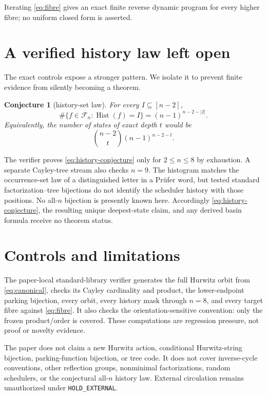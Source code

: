 \documentclass[a4paper,10pt]{amsart}
\newtheorem{conjecture}[theorem]{Conjecture}
\theoremstyle{remark}
\newcommand{\Fcal}{\mathcal F}
\newcommand{\Hist}{\operatorname{Hist}}
\begin{document}
Iterating \eqref{eq:fibre} gives an exact finite reverse dynamic program for
every higher fibre; no uniform closed form is asserted.

\section{A verified history law left open}

The exact controls expose a stronger pattern.  We isolate it to prevent
finite evidence from silently becoming a theorem.

\begin{conjecture}[history-set law]\label{conj:history}
For every $I\subseteq[n-2]$,
\begin{equation}\label{eq:history-conjecture}
 \#\{f\in\Fcal_n:\Hist(f)=I\}=(n-1)^{n-2-|I|}.
\end{equation}
Equivalently, the number of states of exact depth $t$ would be
\begin{equation}\label{eq:depth-conjecture}
 \binom{n-2}{t}(n-1)^{n-2-t}.
\end{equation}
\end{conjecture}

The verifier proves \eqref{eq:history-conjecture} only for $2\le n\le8$ by
exhaustion.  A separate Cayley-tree stream also checks $n=9$.  The histogram
matches the occurrence-set law of a distinguished letter in a Pr\"ufer word,
but tested standard factorization--tree bijections do not identify the
scheduler history with those positions.  No all-$n$ bijection is presently
known here.  Accordingly \eqref{eq:history-conjecture}, the resulting unique
deepest-state claim, and any derived basin formula receive no theorem status.

\section{Controls and limitations}

The paper-local standard-library verifier generates the full Hurwitz orbit
from \eqref{eq:canonical}, checks its Cayley cardinality and product, the
lower-endpoint parking bijection, every orbit, every history mask through
$n=8$, and every target fibre against \eqref{eq:fibre}.  It also checks the
orientation-sensitive convention: only the frozen product/order is covered.
These computations are regression pressure, not proof or novelty evidence.

The paper does not claim a new Hurwitz action, conditional Hurwitz-string
bijection, parking-function bijection, or tree code.  It does not cover inverse-cycle conventions, other reflection
groups, nonminimal factorizations, random schedulers, or the conjectural
all-$n$ history law.  External circulation remains unauthorized under
\texttt{HOLD\_EXTERNAL}.



\end{document}
